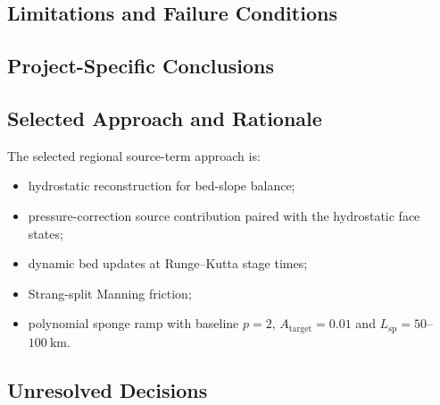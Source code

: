 
\subsection{Limitations and Failure Conditions}
\label{sec:res-num-src-limitations}


\subsection{Project-Specific Conclusions}
\label{sec:res-num-src-conclusions}


\subsection{Selected Approach and Rationale}
\label{sec:res-num-src-selected-approach}


The selected regional source-term approach is:

\begin{itemize}
  \item hydrostatic reconstruction for bed-slope balance;
  \item pressure-correction source contribution paired with the
    hydrostatic face states;
  \item dynamic bed updates at Runge--Kutta stage times;
  \item Strang-split Manning friction;
  \item polynomial sponge ramp with baseline $p=2$,
    $A_{\mathrm{target}}=0.01$ and $L_{\mathrm{sp}}=50$--$100~\mathrm{km}$.
\end{itemize}

\subsection{Unresolved Decisions}
\label{sec:res-num-src-unresolved-decisions}


